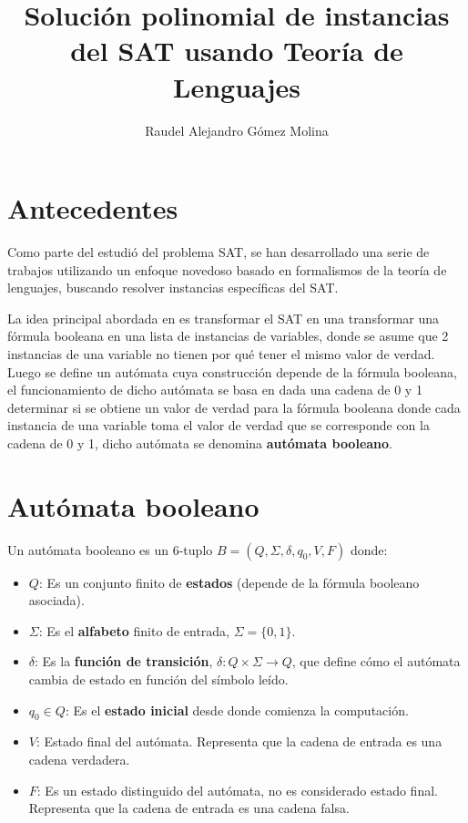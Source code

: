 \documentclass{article}
\title{Solución polinomial de instancias del SAT usando Teoría de Lenguajes}
\author{Raudel Alejandro Gómez Molina}
\begin{document}
\maketitle

\section{Antecedentes}

Como parte del estudió del problema SAT, se han desarrollado una serie de trabajos utilizando un enfoque
novedoso basado en formalismos de la teoría de lenguajes, buscando resolver instancias específicas del SAT.

La idea principal abordada en \cite{aCFSAT} es transformar el SAT en una transformar una fórmula booleana en una lista de instancias de variables,
donde se asume que 2 instancias de una variable no tienen por qué tener el mismo valor de verdad. Luego
se define un autómata cuya construcción depende de la fórmula booleana, el funcionamiento
de dicho autómata se basa en dada una cadena de 0 y 1 determinar si se obtiene un valor
de verdad para la fórmula booleana donde cada instancia de una variable toma el valor de verdad que se
corresponde con la cadena de 0 y 1, dicho autómata se denomina \textbf{autómata booleano}.

\section{Autómata booleano}

Un autómata booleano \cite{aCFSAT} es un 6-tuplo $B=(Q,\Sigma,\delta,q_0,V,F)$ donde:

\begin{itemize}
      \item $Q$: Es un conjunto finito de \textbf{estados} (depende de la fórmula booleano asociada).
      \item $\Sigma$: Es el \textbf{alfabeto} finito de entrada, $\Sigma =\{0,1\}$.
      \item $\delta$: Es la \textbf{función de transición}, $\delta: Q \times \Sigma \to Q$, que define cómo el autómata cambia de estado en función del símbolo leído.
      \item $q_0 \in Q$: Es el \textbf{estado inicial} desde donde comienza la computación.
      \item  $V$: Estado final del autómata. Representa que la cadena de entrada es una
            cadena verdadera.
      \item  $F$: Es un estado distinguido del autómata, no es considerado estado final.
            Representa que la cadena de entrada es una cadena falsa.
            
\end{itemize}
\end{document}
